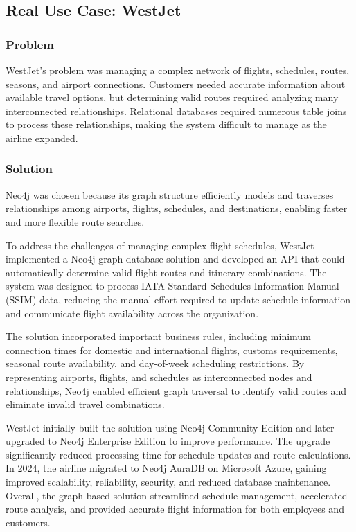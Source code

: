 \documentclass[10pt,a4paper,twocolumn]{article}
\begin{document}
\subsection{Real Use Case: WestJet}

\subsubsection*{Problem}

WestJet's problem was managing a complex network of flights, schedules, routes, seasons, and airport connections. Customers needed accurate information about available travel options, but determining valid routes required analyzing many interconnected relationships. Relational databases required numerous table joins to process these relationships, making the system difficult to manage as the airline expanded.

\subsubsection*{Solution}

Neo4j was chosen because its graph structure efficiently models and traverses relationships among airports, flights, schedules, and destinations, enabling faster and more flexible route searches.

To address the challenges of managing complex flight schedules, WestJet implemented a Neo4j graph database solution and developed an API that could automatically determine valid flight routes and itinerary combinations. The system was designed to process IATA Standard Schedules Information Manual (SSIM) data, reducing the manual effort required to update schedule information and communicate flight availability across the organization.

The solution incorporated important business rules, including minimum connection times for domestic and international flights, customs requirements, seasonal route availability, and day-of-week scheduling restrictions. By representing airports, flights, and schedules as interconnected nodes and relationships, Neo4j enabled efficient graph traversal to identify valid routes and eliminate invalid travel combinations.

WestJet initially built the solution using Neo4j Community Edition and later upgraded to Neo4j Enterprise Edition to improve performance. The upgrade significantly reduced processing time for schedule updates and route calculations. In 2024, the airline migrated to Neo4j AuraDB on Microsoft Azure, gaining improved scalability, reliability, security, and reduced database maintenance. Overall, the graph-based solution streamlined schedule management, accelerated route analysis, and provided accurate flight information for both employees and customers.
\end{document}
